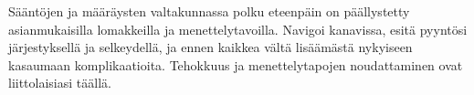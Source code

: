 \documentclass{article}
\begin{document}
\begin{infobox}
Sääntöjen ja määräysten valtakunnassa polku eteenpäin on päällystetty asianmukaisilla lomakkeilla ja menettelytavoilla. Navigoi kanavissa, esitä pyyntösi järjestyksellä ja selkeydellä, ja ennen kaikkea vältä lisäämästä nykyiseen kasaumaan komplikaatioita. Tehokkuus ja menettelytapojen noudattaminen ovat liittolaisiasi täällä.
\end{infobox}
\end{document}
